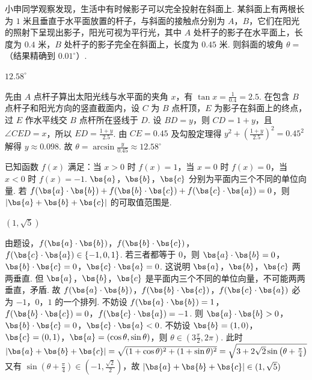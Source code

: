 \begin{problem}
小申同学观察发现，生活中有时候影子可以完全投射在斜面上. 某斜面上有两根长为 \(1\) 米且垂直于水平面放置的杆子，与斜面的接触点分别为 \(A\)，\(B\)，它们在阳光的照射下呈现出影子，阳光可视为平行光，其中 \(A\) 处杆子的影子在水平面上，长度为 \(0.4\) 米，\(B\) 处杆子的影子完全在斜面上，长度为 \(0.45\) 米. 则斜面的坡角 \(\theta=\)\fillinblank{}（结果精确到 \(0.01^\circ\)）.

\end{problem}

\begin{answer}
\(12.58^\circ\)
\end{answer}

\begin{solution}
先由 \(A\) 点杆子算出太阳光线与水平面的夹角 \(x\)，有 \(\tan x=\frac{1}{0.4}=2.5\).
在包含 \(B\) 点杆子和阳光方向的竖直截面内，设 \(C\) 为 \(B\) 点杆顶，\(E\) 为影子在斜面上的终点，过 \(E\) 作水平线交 \(B\) 点杆所在竖线于 \(D\). 设 \(BD=y\)，则 \(CD=1+y\)，且 \(\angle CED=x\)，所以 \(ED=\frac{1+y}{2.5}\).
由 \(CE=0.45\) 及勾股定理得
\(
y^2+\left(\frac{1+y}{2.5}\right)^2=0.45^2
\)
解得 \(y\approx0.098\).
故
\(
\theta=\arcsin\frac{y}{0.45}\approx12.58^\circ
\)
\end{solution}

\begin{problem}
已知函数 \(f(x)\) 满足：当 \(x>0\) 时 \(f(x)=1\)，当 \(x=0\) 时 \(f(x)=0\)，当 \(x<0\) 时 \(f(x)=-1\). \(\bs{a}\)，\(\bs{b}\)，\(\bs{c}\) 分别为平面内三个不同的单位向量. 若 \(f(\bs{a}\cdot\bs{b})+f(\bs{b}\cdot\bs{c})+f(\bs{c}\cdot\bs{a})=0\)，则 \(|\bs{a}+\bs{b}+\bs{c}|\) 的可取值范围是\fillinblank{}.
\end{problem}

\begin{answer}
\((1,\sqrt5)\)
\end{answer}

\begin{solution}
由题设，\(f(\bs{a}\cdot\bs{b})\)，\(f(\bs{b}\cdot\bs{c})\)，\(f(\bs{c}\cdot\bs{a})\in\{-1,0,1\}\). 若三者都等于 \(0\)，则
\(\bs{a}\cdot\bs{b}=0\)，\(\bs{b}\cdot\bs{c}=0\)，\(\bs{c}\cdot\bs{a}=0\).
这说明 \(\bs{a}\)，\(\bs{b}\)，\(\bs{c}\) 两两垂直. 但 \(\bs{a}\)，\(\bs{b}\)，\(\bs{c}\) 是平面内三个不同的单位向量，不可能两两垂直，矛盾.
故 \(f(\bs{a}\cdot\bs{b})\)，\(f(\bs{b}\cdot\bs{c})\)，\(f(\bs{c}\cdot\bs{a})\) 必为 \(-1\)，\(0\)，\(1\) 的一个排列. 不妨设
\(f(\bs{a}\cdot\bs{b})=1\)，\(f(\bs{b}\cdot\bs{c})=0\)，\(f(\bs{c}\cdot\bs{a})=-1\).
则
\(\bs{a}\cdot\bs{b}>0\)，\(\bs{b}\cdot\bs{c}=0\)，\(\bs{c}\cdot\bs{a}<0\).
不妨设 \(\bs{b}=(1,0)\)，\(\bs{c}=(0,1)\)，\(\bs{a}=(\cos\theta,\sin\theta)\)，则 \(\theta\in(3\frac{\pi}{2},2\pi)\). 此时
\(
|\bs{a}+\bs{b}+\bs{c}|=\sqrt{(1+\cos\theta)^2+(1+\sin\theta)^2}=\sqrt{3+2\sqrt2\sin\left(\theta+\frac{\pi}{4}\right)}
\)
又有 \(\sin\left(\theta+\frac{\pi}{4}\right)\in\left(-1,\frac{\sqrt2}{2}\right)\)，故
\(
|\bs{a}+\bs{b}+\bs{c}|\in(1,\sqrt5)
\)
\end{solution}

